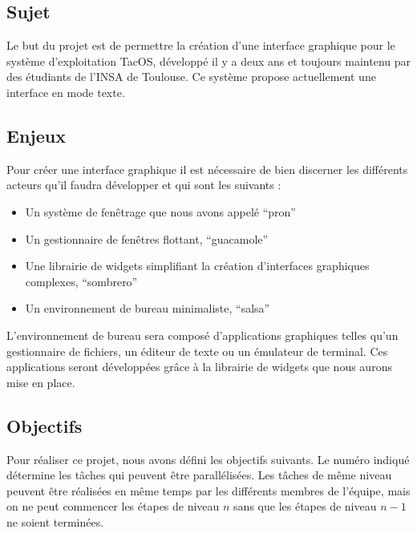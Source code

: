 \subsection{Sujet}
Le but du projet est de permettre la création d'une interface graphique pour le système d'exploitation TacOS, développé il y a deux ans et toujours maintenu par des étudiants de l'INSA de Toulouse. Ce système propose actuellement une interface en mode texte.

\subsection{Enjeux}
Pour créer une interface graphique il est nécessaire de bien discerner les différents acteurs qu'il faudra développer et qui sont les suivants :

\begin{itemize}
\renewcommand{\labelitemi}{$\bullet$}
\item Un système de fenêtrage que nous avons appelé ``pron''
\item Un gestionnaire de fenêtres flottant, ``guacamole''
\item Une librairie de widgets simplifiant la création d'interfaces graphiques complexes, ``sombrero''
\item Un environnement de bureau minimaliste, ``salsa''
\end{itemize}

L'environnement de bureau sera composé d'applications graphiques telles qu'un gestionnaire de fichiers, un éditeur de texte ou un émulateur de terminal. Ces applications seront développées grâce à la librairie de widgets que nous aurons mise en place.

\subsection{Objectifs}
Pour réaliser ce projet, nous avons défini les objectifs suivants. Le numéro indiqué détermine les tâches qui peuvent être parallélisées. Les tâches de même niveau peuvent être réalisées en même temps par les différents membres de l'équipe, mais on ne peut commencer les étapes de niveau $n$ sans que les étapes de niveau $n-1$ ne soient terminées.


